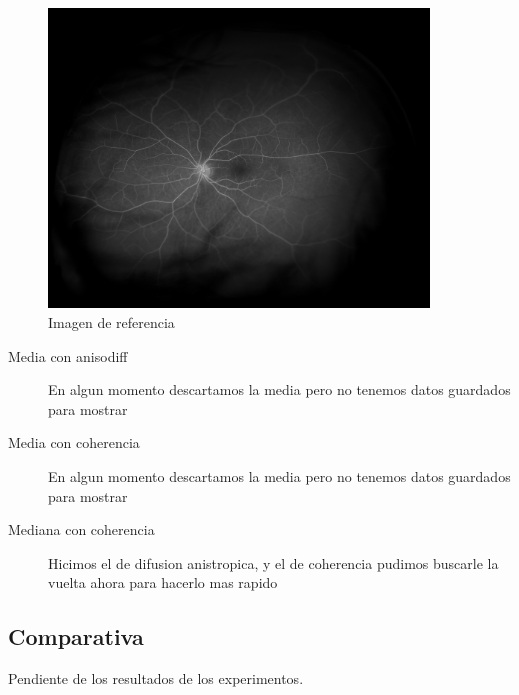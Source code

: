 \begin{figure}[H]
\centering
\includegraphics[width=0.9\textwidth]{./Figures/Results/GER2.png}
\caption{Imagen de referencia}
\end{figure}




\begin{description}
  \item[Media con anisodiff] En algun momento descartamos la media pero no tenemos datos guardados para mostrar
  \item[Media con coherencia] En algun momento descartamos la media pero no tenemos datos guardados para mostrar
  \item[Mediana con coherencia] Hicimos el de difusion anistropica, y el de coherencia pudimos buscarle la vuelta ahora para hacerlo mas rapido
\end{description}

\subsection{Comparativa}

Pendiente de los resultados de los experimentos.












